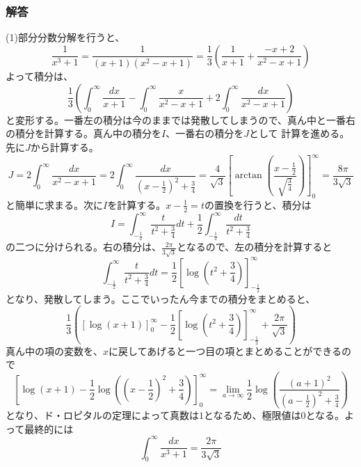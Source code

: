 \documentclass[a4j,dvipdfmx]{jsarticle}
\begin{document}
\subsubsection*{解答}
(1)部分分数分解を行うと、
\begin{equation*}
    \frac{1}{x^3+1}=\frac{1}{(x+1)(x^2-x+1)}=\frac{1}{3}\left(\frac{1}{x+1}+\frac{-x+2}{x^2-x+1}\right)
\end{equation*}
よって積分は、
\begin{equation*}
    \frac{1}{3}\left(\int_0^\infty\frac{dx}{x+1}-\int_0^\infty \frac{x}{x^2-x+1}+2\int_0^\infty\frac{dx}{x^2-x+1}\right)
\end{equation*}
と変形する。一番左の積分は今のままでは発散してしまうので、真ん中と一番右の積分を計算する。真ん中の積分を$I$、一番右の積分を$J$として
計算を進める。先に$J$から計算する。
\begin{equation*}
    J=2\int_0^\infty \frac{dx}{x^2-x+1}=2\int_0^\infty \frac{dx}{(x-\frac{1}{2})^2+\frac{3}{4}}=\frac{4}{\sqrt{3}}\left[\arctan(\frac{x-\frac{1}{2}}{\sqrt{\frac{3}{4}}})\right]_0^\infty =\frac{8\pi}{3\sqrt{3}}
\end{equation*}
と簡単に求まる。次に$I$を計算する。$x-\frac{1}{2}=t$の置換を行うと、積分は  
\begin{equation*}
    I=\int_{-\frac{1}{2}}^\infty \frac{t}{t^2+\frac{3}{4}}dt+\frac{1}{2}\int_{-\frac{1}{2}}^\infty \frac{dt}{t^2+\frac{3}{4}} 
\end{equation*}
の二つに分けられる。右の積分は、$\displaystyle\frac{2\pi}{3\sqrt{3}}$となるので、左の積分を計算すると
\begin{equation*}
    \int_{-\frac{1}{2}}^{\infty}\frac{t}{t^2+\frac{3}{4}}dt=\frac{1}{2}\left[\log(t^2+\frac{3}{4})\right]_{-\frac{1}{2}}^\infty
\end{equation*}
となり、発散してしまう。ここでいったん今までの積分をまとめると、
\begin{equation*}
    \frac{1}{3}\left(\left[\log(x+1)\right]_0^\infty -\frac{1}{2}\left[\log(t^2+\frac{3}{4})\right]_{-\frac{1}{2}}^\infty+\frac{2\pi}{\sqrt{3}}\right)
\end{equation*}
真ん中の項の変数を、$x$に戻してあげると一つ目の項とまとめることができるので
\begin{equation*}
    \left[\log(x+1)-\frac{1}{2}\log((x-\frac{1}{2})^2+\frac{3}{4})\right]_0^\infty=\lim_{a\to\infty}\frac{1}{2}\log\left(\frac{(a+1)^2}{(a-\frac{1}{2})^2+\frac{3}{4}}\right)
\end{equation*}
となり、ド・ロピタルの定理によって真数は$1$となるため、極限値は$0$となる。よって最終的には
\begin{equation*}
    \int_0^\infty\frac{dx}{x^3+1}=\frac{2\pi}{3\sqrt{3}}
\end{equation*}
\end{document}
